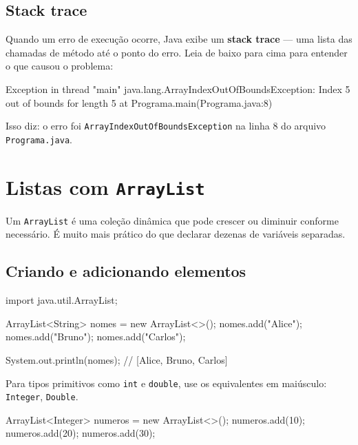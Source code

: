 \documentclass[12pt, a4paper]{article}
\newcommand{\code}[1]{\texttt{\color{javaDeep}#1}}
\begin{document}
\subsection{Stack trace}

Quando um erro de execução ocorre, Java exibe um \textbf{stack trace} — uma lista das chamadas de método até o ponto do erro. Leia de baixo para cima para entender o que causou o problema:

\begin{plaincode}
Exception in thread "main" java.lang.ArrayIndexOutOfBoundsException: Index 5 out of bounds for length 5
    at Programa.main(Programa.java:8)
\end{plaincode}

Isso diz: o erro foi \code{ArrayIndexOutOfBoundsException} na linha 8 do arquivo \code{Programa.java}.

\section{Listas com \texttt{ArrayList}}

Um \code{ArrayList} é uma coleção dinâmica que pode crescer ou diminuir conforme necessário. É muito mais prático do que declarar dezenas de variáveis separadas.

\subsection{Criando e adicionando elementos}

\begin{javacode}
import java.util.ArrayList;

ArrayList<String> nomes = new ArrayList<>();
nomes.add("Alice");
nomes.add("Bruno");
nomes.add("Carlos");

System.out.println(nomes); // [Alice, Bruno, Carlos]
\end{javacode}

\begin{callout}[Dica]
Para tipos primitivos como \code{int} e \code{double}, use os equivalentes em maiúsculo:
\code{Integer}, \code{Double}.
\end{callout}

\begin{javacode}
ArrayList<Integer> numeros = new ArrayList<>();
numeros.add(10);
numeros.add(20);
numeros.add(30);
\end{javacode}
\end{document}
